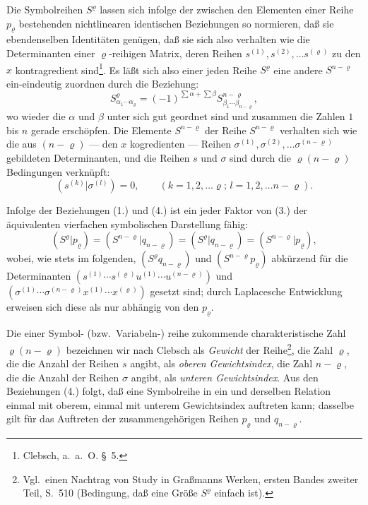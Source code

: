 \documentclass[12pt,a4paper]{article}
\begin{document}
Die Symbolreihen $S^{\varrho}$ lassen sich infolge der zwischen den Elementen einer Reihe $p_{\varrho}$ bestehenden nichtlinearen identischen Beziehungen so normieren, daß sie ebendenselben Identitäten genügen, daß sie sich also verhalten wie die Determinanten einer $\varrho$-reihigen Matrix, deren Reihen $s^{(1)}, s^{(2)}, \ldots s^{(\varrho)}$ zu den $x$ kontragredient sind\footnote{Clebsch, a.\ a.\ O. \S\ 5.}. Es läßt sich also einer jeden Reihe $S^{\varrho}$ eine andere $S^{n-\varrho}$ ein-eindeutig zuordnen durch die Beziehung:
\begin{equation}\tag{4}
S^{\varrho}_{\alpha_{1} \cdots \alpha_{\varrho}} = (-1)^{\sum \alpha + \sum \beta} S^{n-\varrho}_{\beta_{1} \cdots \beta_{n-\varrho}},
\end{equation}
wo wieder die $\alpha$ und $\beta$ unter sich gut geordnet sind und zusammen die Zahlen $1$ bis $n$ gerade erschöpfen. Die Elemente $S^{n-\varrho}$ der Reihe $S^{n-\varrho}$ verhalten sich wie die aus $(n-\varrho)$ --- den $x$ kogredienten --- Reihen $\sigma^{(1)}, \sigma^{(2)}, \ldots \sigma^{(n-\varrho)}$ gebildeten Determinanten, und die Reihen $s$ und $\sigma$ sind durch die $\varrho(n-\varrho)$ Bedingungen verknüpft:
\begin{equation}\tag{5}
(s^{(k)} | \sigma^{(l)}) = 0, \qquad (k = 1, 2, \ldots \varrho; \, l = 1, 2, \ldots n-\varrho).
\end{equation}

Infolge der Beziehungen (1.) und (4.) ist ein jeder Faktor von (3.) der äquivalenten vierfachen symbolischen Darstellung fähig:
\begin{equation*}
(S^{\varrho} | p_{\varrho}) = (S^{n-\varrho} | q_{n-\varrho}) = (S^{\varrho} | q_{n-\varrho}) = (S^{n-\varrho} | p_{\varrho}),
\end{equation*}
wobei, wie stets im folgenden, $(S^{\varrho} q_{n-\varrho})$ und $(S^{n-\varrho} p_{\varrho})$ abkürzend für die Determinanten $(s^{(1)} \cdots s^{(\varrho)} u^{(1)} \cdots u^{(n-\varrho)})$ und $(\sigma^{(1)} \cdots \sigma^{(n-\varrho)} x^{(1)} \cdots x^{(\varrho)})$ gesetzt sind; durch Laplacesche Entwicklung erweisen sich diese als nur abhängig von den $p_{\varrho}$.

Die einer Symbol- (bzw.\ Variabeln-) reihe zukommende charakteristische Zahl $\varrho(n-\varrho)$ bezeichnen wir nach Clebsch als \textit{Gewicht} der Reihe\footnote{Vgl.\ einen Nachtrag von Study in Graßmanns Werken, ersten Bandes zweiter Teil, S.~510 (Bedingung, daß eine Größe $S^{\varrho}$ einfach ist).}, die Zahl $\varrho$, die die Anzahl der Reihen $s$ angibt, als \textit{oberen Gewichtsindex}, die Zahl $n-\varrho$, die die Anzahl der Reihen $\sigma$ angibt, als \textit{unteren Gewichtsindex}. Aus den Beziehungen (4.) folgt, daß eine Symbolreihe in ein und derselben Relation einmal mit oberem, einmal mit unterem Gewichtsindex auftreten kann; dasselbe gilt für das Auftreten der zusammengehörigen Reihen $p_{\varrho}$ und $q_{n-\varrho}$.
\end{document}
